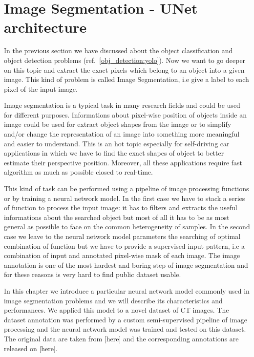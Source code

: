 \documentclass{standalone}
\begin{document}
\section[UNet]{Image Segmentation - UNet architecture}\label{segmentation:unet}


In the previous section we have discussed about the object classification and object detection problems (ref.~\ref{obj_detection:yolo}).
Now we want to go deeper on this topic and extract the exact pixels which belong to an object into a given image.
This kind of problem is called Image Segmentation, i.e give a label to each pixel of the input image.

Image segmentation is a typical task in many research fields and could be used for different purposes.
Informations about pixel-wise position of objects inside an image could be used for extract object shapes from the image or to simplify and/or change the representation of an image into something more meaningful and easier to understand.
This is an hot topic especially for self-driving car applications in which we have to find the exact shapes of object to better estimate their perspective position.
Moreover, all these applications require fast algorithm as much as possible closed to real-time.

This kind of task can be performed using a pipeline of image processing functions or by training a neural network model.
In the first case we have to stack a series of function to process the input image: it has to filters and extracts the useful informations about the searched object but most of all it has to be as most general as possible to face on the common heterogeneity of samples.
In the second case we leave to the neural network model parameters the searching of optimal combination of function but we have to provide a supervised input pattern, i.e a combination of input and annotated pixel-wise mask of each image.
The image annotation is one of the most hardest and boring step of image segmentation and for these reasons is very hard to find public dataset usable.

In this chapter we introduce a particular neural network model commonly used in image segmentation problems and we will describe its characteristics and performances.
We applied this model to a novel dataset of CT images.
The dataset annotation was performed by a custom semi-supervised pipeline of image processing and the neural network model was trained and tested on this dataset.
The original data are taken from [here] and the corresponding annotations are released on [here].
\end{document}
